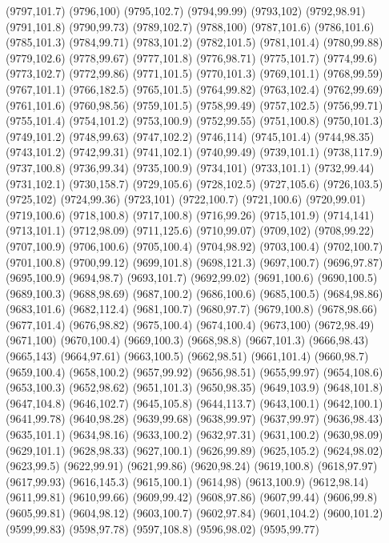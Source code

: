 (9797,101.7)
(9796,100)
(9795,102.7)
(9794,99.99)
(9793,102)
(9792,98.91)
(9791,101.8)
(9790,99.73)
(9789,102.7)
(9788,100)
(9787,101.6)
(9786,101.6)
(9785,101.3)
(9784,99.71)
(9783,101.2)
(9782,101.5)
(9781,101.4)
(9780,99.88)
(9779,102.6)
(9778,99.67)
(9777,101.8)
(9776,98.71)
(9775,101.7)
(9774,99.6)
(9773,102.7)
(9772,99.86)
(9771,101.5)
(9770,101.3)
(9769,101.1)
(9768,99.59)
(9767,101.1)
(9766,182.5)
(9765,101.5)
(9764,99.82)
(9763,102.4)
(9762,99.69)
(9761,101.6)
(9760,98.56)
(9759,101.5)
(9758,99.49)
(9757,102.5)
(9756,99.71)
(9755,101.4)
(9754,101.2)
(9753,100.9)
(9752,99.55)
(9751,100.8)
(9750,101.3)
(9749,101.2)
(9748,99.63)
(9747,102.2)
(9746,114)
(9745,101.4)
(9744,98.35)
(9743,101.2)
(9742,99.31)
(9741,102.1)
(9740,99.49)
(9739,101.1)
(9738,117.9)
(9737,100.8)
(9736,99.34)
(9735,100.9)
(9734,101)
(9733,101.1)
(9732,99.44)
(9731,102.1)
(9730,158.7)
(9729,105.6)
(9728,102.5)
(9727,105.6)
(9726,103.5)
(9725,102)
(9724,99.36)
(9723,101)
(9722,100.7)
(9721,100.6)
(9720,99.01)
(9719,100.6)
(9718,100.8)
(9717,100.8)
(9716,99.26)
(9715,101.9)
(9714,141)
(9713,101.1)
(9712,98.09)
(9711,125.6)
(9710,99.07)
(9709,102)
(9708,99.22)
(9707,100.9)
(9706,100.6)
(9705,100.4)
(9704,98.92)
(9703,100.4)
(9702,100.7)
(9701,100.8)
(9700,99.12)
(9699,101.8)
(9698,121.3)
(9697,100.7)
(9696,97.87)
(9695,100.9)
(9694,98.7)
(9693,101.7)
(9692,99.02)
(9691,100.6)
(9690,100.5)
(9689,100.3)
(9688,98.69)
(9687,100.2)
(9686,100.6)
(9685,100.5)
(9684,98.86)
(9683,101.6)
(9682,112.4)
(9681,100.7)
(9680,97.7)
(9679,100.8)
(9678,98.66)
(9677,101.4)
(9676,98.82)
(9675,100.4)
(9674,100.4)
(9673,100)
(9672,98.49)
(9671,100)
(9670,100.4)
(9669,100.3)
(9668,98.8)
(9667,101.3)
(9666,98.43)
(9665,143)
(9664,97.61)
(9663,100.5)
(9662,98.51)
(9661,101.4)
(9660,98.7)
(9659,100.4)
(9658,100.2)
(9657,99.92)
(9656,98.51)
(9655,99.97)
(9654,108.6)
(9653,100.3)
(9652,98.62)
(9651,101.3)
(9650,98.35)
(9649,103.9)
(9648,101.8)
(9647,104.8)
(9646,102.7)
(9645,105.8)
(9644,113.7)
(9643,100.1)
(9642,100.1)
(9641,99.78)
(9640,98.28)
(9639,99.68)
(9638,99.97)
(9637,99.97)
(9636,98.43)
(9635,101.1)
(9634,98.16)
(9633,100.2)
(9632,97.31)
(9631,100.2)
(9630,98.09)
(9629,101.1)
(9628,98.33)
(9627,100.1)
(9626,99.89)
(9625,105.2)
(9624,98.02)
(9623,99.5)
(9622,99.91)
(9621,99.86)
(9620,98.24)
(9619,100.8)
(9618,97.97)
(9617,99.93)
(9616,145.3)
(9615,100.1)
(9614,98)
(9613,100.9)
(9612,98.14)
(9611,99.81)
(9610,99.66)
(9609,99.42)
(9608,97.86)
(9607,99.44)
(9606,99.8)
(9605,99.81)
(9604,98.12)
(9603,100.7)
(9602,97.84)
(9601,104.2)
(9600,101.2)
(9599,99.83)
(9598,97.78)
(9597,108.8)
(9596,98.02)
(9595,99.77)
